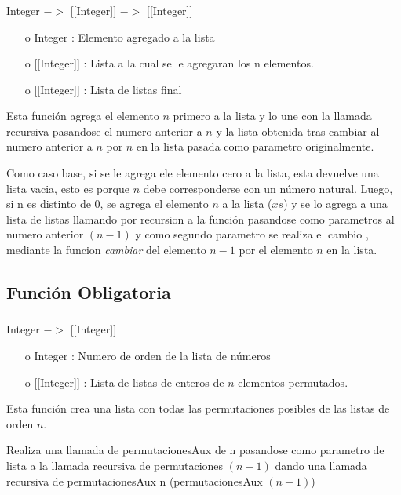 \documentclass[10pt,journal]{IEEEtran}
\begin{document}
\subsubsection{\color{Red}{permutacionesAux}}
\begin{description}[style=nextline]
        \item[\color{Green}{Signatura}] Integer $->$ [[Integer]] $->$ [[Integer]]
        \begin{itemize} 
        \item [o]  Integer : Elemento agregado a la lista
        \item [o] [[Integer]] : Lista a la cual se le agregaran los n elementos.
        \item [o] [[Integer]] : Lista de listas final
        \end{itemize}        
        
        \item[\color{Green}{Descripción}] Esta función agrega el elemento $n$ primero a la lista y lo une con 
la llamada recursiva pasandose el numero anterior a $n$ 
y la lista obtenida tras cambiar al numero anterior a 
$n$ por $n$ en la lista pasada como parametro originalmente. 

Como caso base, si se le agrega ele elemento cero a la lista, esta devuelve una lista vacia, esto es porque $n$ debe corresponderse con un número natural. Luego, si n es distinto de $0$, se agrega el elemento $n$ a la lista ($xs$) y se lo agrega a una lista de listas llamando por recursion a la función pasandose como parametros al numero anterior $(n-1)$ y como segundo parametro se realiza el cambio , mediante la funcion \textit{cambiar} del elemento $n-1$ por el elemento $n$ en la lista.
\end{description}


\subsection{Función Obligatoria}
\subsubsection{\color{Red}{permutaciones}}
\begin{description}[style=nextline]
        \item[\color{Green}{Signatura}] Integer $->$ [[Integer]]  
        \begin{itemize}
        \item [o]  Integer : Numero de orden de la lista de números
        \item [o] [[Integer]] : Lista de listas de enteros de $n$ elementos permutados. 
        \end{itemize}        
        
        \item[\color{Green}{Descripción}] Esta función crea una lista con todas las permutaciones posibles de las listas de orden $n$.
        
 Realiza una llamada de permutacionesAux de n pasandose como 
parametro de lista a la llamada recursiva de permutaciones $(n-1)$
dando una llamada recursiva de permutacionesAux n (permutacionesAux $(n-1)$)   
\end{description}
\end{document}
